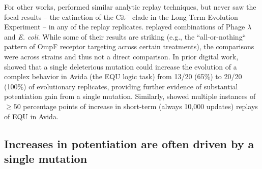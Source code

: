 For other works, \citet{turnerReplayingEvolutionTest2015} performed similar analytic replay techniques, but never saw the focal results -- the extinction of the Cit$^{-}$ clade in the Long Term Evolution Experiment -- in any of the replay replicates. 
\citet{meyerRepeatabilityContingencyEvolution2012} replayed combinations of Phage $\lambda$ and \textit{E. coli}. 
While some of their results are striking (e.g., the ``all-or-nothing`` pattern of OmpF receptor targeting across certain treatments), the comparisons were across strains and thus not a direct comparison. 
In prior digital work, \citet{covertiiiExperimentsRoleDeleterious2013} showed that a single deleterious mutation could increase the evolution of a complex behavior in Avida (the EQU logic task) from 13/20 (65\%) to 20/20 (100\%) of evolutionary replicates, providing further evidence of substantial potentiation gain from a single mutation.
Similarly, \citet{brysonEvolutionaryPotentialPopulations2012} showed multiple instances of $\geq 50$ percentage points of increase in short-term (always 10,000 updates) replays of EQU in Avida. 


\subsection{Increases in potentiation are often driven by a single mutation}

